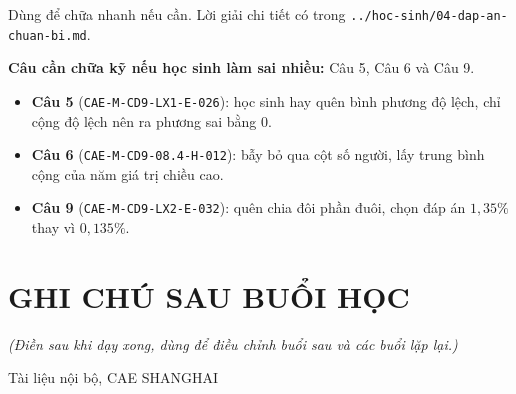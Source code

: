 \documentclass[11pt, a4paper]{article}
\begin{document}
Dùng để chữa nhanh nếu cần. Lời giải chi tiết có trong \texttt{../hoc-sinh/04-dap-an-chuan-bi.md}.


\textbf{Câu cần chữa kỹ nếu học sinh làm sai nhiều:} Câu 5, Câu 6 và Câu 9.

\begin{itemize}[leftmargin=1.4em, itemsep=2pt]
\item \textbf{Câu 5} (\texttt{CAE-M-CD9-LX1-E-026}): học sinh hay quên bình phương độ lệch, chỉ cộng độ lệch nên ra phương sai bằng $0$.
\item \textbf{Câu 6} (\texttt{CAE-M-CD9-08.4-H-012}): bẫy bỏ qua cột số người, lấy trung bình cộng của năm giá trị chiều cao.
\item \textbf{Câu 9} (\texttt{CAE-M-CD9-LX2-E-032}): quên chia đôi phần đuôi, chọn đáp án $1,35\%$ thay vì $0,135\%$.
\end{itemize}

\section{GHI CHÚ SAU BUỔI HỌC}

\emph{(Điền sau khi dạy xong, dùng để điều chỉnh buổi sau và các buổi lặp lại.)}

\vspace{0.8cm}
\begin{center}
{\footnotesize\color{cae_blue} Tài liệu nội bộ, CAE SHANGHAI}
\end{center}
\end{document}
